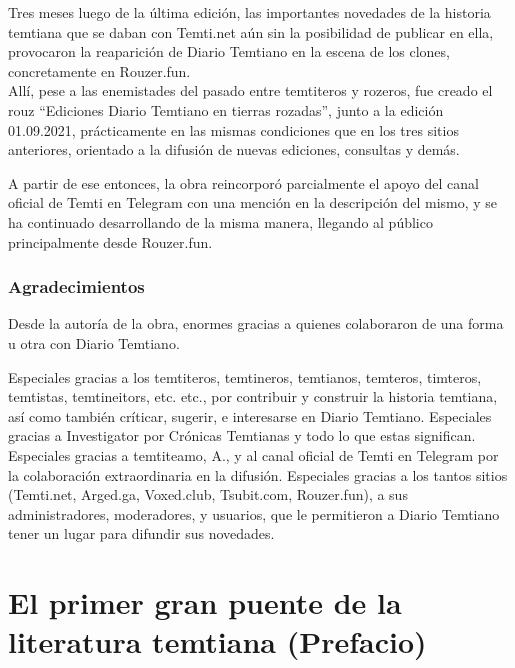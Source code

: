 \documentclass[
  spanish,
]{book}
\begin{document}
Tres meses luego de la última edición, las importantes novedades de la historia temtiana que se daban con Temti.net aún sin la posibilidad de publicar en ella, provocaron la reaparición de Diario Temtiano en la escena de los clones, concretamente en Rouzer.fun.\\
Allí, pese a las enemistades del pasado entre temtiteros y rozeros, fue creado el rouz ``Ediciones Diario Temtiano en tierras rozadas'', junto a la edición 01.09.2021, prácticamente en las mismas condiciones que en los tres sitios anteriores, orientado a la difusión de nuevas ediciones, consultas y demás.

A partir de ese entonces, la obra reincorporó parcialmente el apoyo del canal oficial de Temti en Telegram con una mención en la descripción del mismo, y se ha continuado desarrollando de la misma manera, llegando al público principalmente desde Rouzer.fun.

\hypertarget{agradecimientos}{%
\subsection*{Agradecimientos}\label{agradecimientos}}

Desde la autoría de la obra, enormes gracias a quienes colaboraron de una forma u otra con Diario Temtiano.

Especiales gracias a los temtiteros, temtineros, temtianos, temteros, timteros, temtistas, temtineitors, etc. etc., por contribuir y construir la historia temtiana, así como también críticar, sugerir, e interesarse en Diario Temtiano. Especiales gracias a Investigator por Crónicas Temtianas y todo lo que estas significan. Especiales gracias a temtiteamo, A., y al canal oficial de Temti en Telegram por la colaboración extraordinaria en la difusión. Especiales gracias a los tantos sitios (Temti.net, Arged.ga, Voxed.club, Tsubit.com, Rouzer.fun), a sus administradores, moderadores, y usuarios, que le permitieron a Diario Temtiano tener un lugar para difundir sus novedades.

\hypertarget{el-primer-gran-puente-de-la-literatura-temtiana-prefacio}{%
\chapter{El primer gran puente de la literatura temtiana (Prefacio)}\label{el-primer-gran-puente-de-la-literatura-temtiana-prefacio}}
\end{document}
